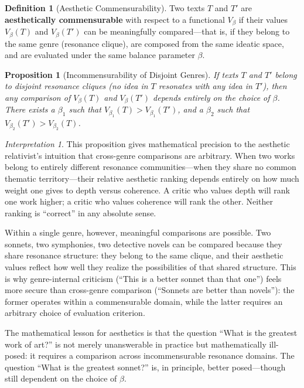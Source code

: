 \documentclass[11pt,openany]{book}
\theoremstyle{definition}
\newtheorem{definition}[axiom]{Definition}
\theoremstyle{plain}
\newtheorem{proposition}[axiom]{Proposition}
\theoremstyle{remark}
\newtheorem{interpretation}[axiom]{Interpretation}
\begin{document}
\begin{definition}[Aesthetic Commensurability]
Two texts $T$ and $T'$ are \textbf{aesthetically commensurable} with respect to a functional $V_\beta$ if their values $V_\beta(T)$ and $V_\beta(T')$ can be meaningfully compared---that is, if they belong to the same genre (resonance clique), are composed from the same ideatic space, and are evaluated under the same balance parameter $\beta$.
\end{definition}

\begin{proposition}[Incommensurability of Disjoint Genres]
If texts $T$ and $T'$ belong to disjoint resonance cliques (no idea in $T$ resonates with any idea in $T'$), then any comparison of $V_\beta(T)$ and $V_\beta(T')$ depends entirely on the choice of $\beta$. There exists a $\beta_1$ such that $V_{\beta_1}(T) > V_{\beta_1}(T')$, and a $\beta_2$ such that $V_{\beta_2}(T') > V_{\beta_2}(T)$.
\end{proposition}

\begin{interpretation}
This proposition gives mathematical precision to the aesthetic relativist's intuition that cross-genre comparisons are arbitrary. When two works belong to entirely different resonance communities---when they share no common thematic territory---their relative aesthetic ranking depends entirely on how much weight one gives to depth versus coherence. A critic who values depth will rank one work higher; a critic who values coherence will rank the other. Neither ranking is ``correct'' in any absolute sense.

Within a single genre, however, meaningful comparisons are possible. Two sonnets, two symphonies, two detective novels can be compared because they share resonance structure: they belong to the same clique, and their aesthetic values reflect how well they realize the possibilities of that shared structure. This is why genre-internal criticism (``This is a better sonnet than that one'') feels more secure than cross-genre comparison (``Sonnets are better than novels''): the former operates within a commensurable domain, while the latter requires an arbitrary choice of evaluation criterion.

The mathematical lesson for aesthetics is that the question ``What is the greatest work of art?'' is not merely unanswerable in practice but mathematically ill-posed: it requires a comparison across incommensurable resonance domains. The question ``What is the greatest sonnet?'' is, in principle, better posed---though still dependent on the choice of $\beta$.
\end{interpretation}
\end{document}
